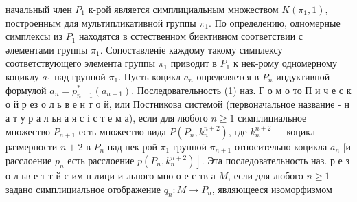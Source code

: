\documentclass[10pt]{article}
\begin{document}
начальный член $P_{1}$ к-рой является симплициальным множеством $K\left(\pi_{1}, 1\right)$, построенным для мультипликативной группы $\pi_{1}$. По определению, одномерные симплексы из $P_{1}$ находятся в сстественном биективном соответствии с әлементами группы $\pi_{1}$. Сопоставленіе каждому такому симплексу соответствующего элемента группы $\pi_{1}$ приводит в $P_{1}$ к нек-рому одномерному коциклу $a_{1}$ над группой $\pi_{1}$. Пусть коцикл $a_{n}$ определяется в $P_{n}$ индуктивной формулой $a_{n}=p_{n-1}^{*}\left(a_{n-1}\right)$. Последовательность (1) наз. Г о м о то П и ч е с к о й р ез о л ь в е н т о й, или Постникова системой (первоначальное название - н а т у р а л ьн а я с і с т е м а), если для любого $n \geqslant 1$ симплициальное множество $P_{n+1}$ есть множество вида $P\left(P_{n}, k_{n}^{n+2}\right)$, где $k_{n}^{n+2}-$ коцикл размерности $n+2$ в $P_{n}$ над нек-рой $\pi_{1}$-группоӥ $\pi_{n+1}$ относительно коцикла $a_{n}$ [и расслоение $p_{n}$ есть расслоение $\left.p\left(P_{n}, k_{n}^{n+2}\right)\right]$. Эта последовательность наз. р е $з$ о л ьв е т т й с им п лици и льного мно о е с тв а $M$, если для любого $n \geqslant 1$ задано симплициальное отображение $q_{n}: M \rightarrow P_{n}$, являющееся изоморфизмом
\end{document}
